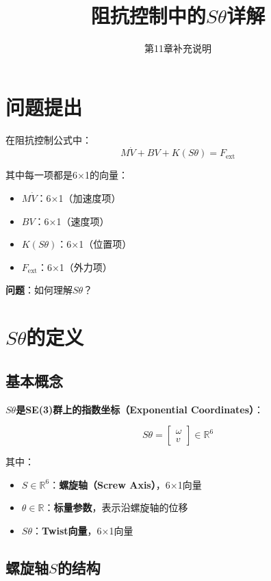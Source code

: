 \documentclass[12pt,a4paper]{article}
\title{阻抗控制中的$S\theta$详解}
\author{第11章补充说明}
\date{}
\begin{document}
\maketitle

\section{问题提出}

在阻抗控制公式中：
\begin{equation}
M\dot{V} + BV + K(S\theta) = F_{\text{ext}} \tag{*}
\end{equation}

其中每一项都是6×1的向量：
\begin{itemize}
\item $M\dot{V}$：6×1（加速度项）
\item $BV$：6×1（速度项）
\item $K(S\theta)$：6×1（位置项）
\item $F_{\text{ext}}$：6×1（外力项）
\end{itemize}

\textbf{问题}：如何理解$S\theta$？

\section{$S\theta$的定义}

\subsection{基本概念}

\textbf{$S\theta$是SE(3)群上的指数坐标（Exponential Coordinates）}：

\begin{equation}
S\theta = \begin{bmatrix} \omega \\ v \end{bmatrix} \in \mathbb{R}^6
\end{equation}

其中：
\begin{itemize}
\item $S \in \mathbb{R}^6$：\textbf{螺旋轴（Screw Axis）}，6×1向量
\item $\theta \in \mathbb{R}$：\textbf{标量参数}，表示沿螺旋轴的位移
\item $S\theta$：\textbf{Twist向量}，6×1向量
\end{itemize}

\subsection{螺旋轴$S$的结构}
\end{document}
